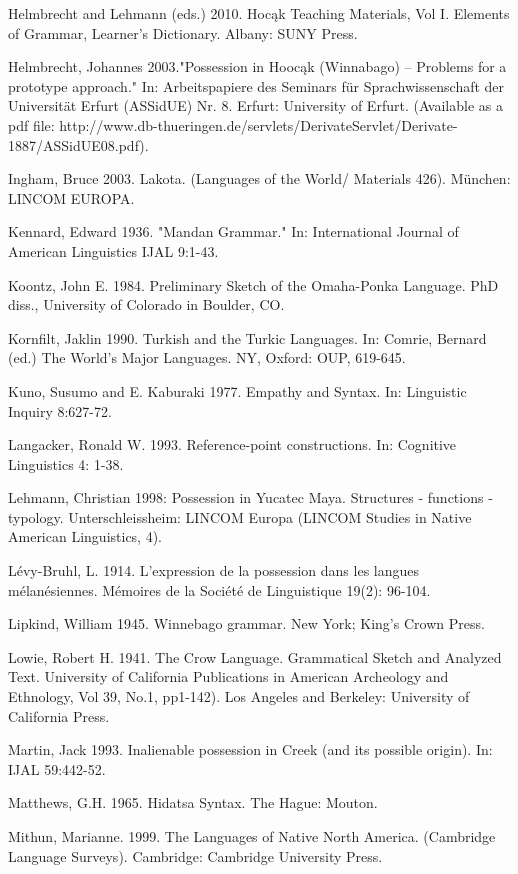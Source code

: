 \documentclass[output=paper]{LSP/langsci}
\begin{document}
\begin{reflist}
Helmbrecht and Lehmann (eds.) 2010. Hoc\k{a}k Teaching Materials, Vol I. Elements of Grammar, Learner's Dictionary. Albany: SUNY Press.

Helmbrecht, Johannes 2003."Possession in Hooc\k{a}k (Winnabago) – Problems for a prototype approach." In: Arbeitspapiere des Seminars für Sprachwissenschaft der Universität Erfurt (ASSidUE) Nr. 8. Erfurt: University of Erfurt. (Available as a pdf file: http://www.db-thueringen.de/servlets/DerivateServlet/Derivate-1887/ASSidUE08.pdf).

Ingham, Bruce 2003. Lakota. (Languages of the World/ Materials 426). München: LINCOM EUROPA.

Kennard, Edward 1936. "Mandan Grammar." In: International Journal of American Linguistics IJAL 9:1-43.

Koontz, John E. 1984. Preliminary Sketch of the Omaha-Ponka Language. PhD diss., University of Colorado in Boulder, CO.

Kornfilt, Jaklin 1990. Turkish and the Turkic Languages. In: Comrie, Bernard (ed.) The World's Major Languages. NY, Oxford: OUP, 619-645.

Kuno, Susumo and E. Kaburaki 1977. Empathy and Syntax. In: Linguistic Inquiry 8:627-72.

Langacker, Ronald W. 1993. Reference-point constructions. In: Cognitive Linguistics 4: 1-38.

Lehmann, Christian 1998: Possession in Yucatec Maya. Structures - functions - typology. Unterschleissheim: LINCOM Europa (LINCOM Studies in Native American Linguistics, 4).

Lévy-Bruhl, L. 1914. L’expression de la possession dans les langues mélanésiennes. Mémoires de la Société de Linguistique 19(2): 96-104.

Lipkind, William 1945. Winnebago grammar. New York; King’s Crown Press.

Lowie, Robert H. 1941. The Crow Language. Grammatical Sketch and Analyzed Text. University of California Publications in American Archeology and Ethnology, Vol 39, No.1, pp1-142). Los Angeles and Berkeley: University of California Press.

Martin, Jack 1993. Inalienable possession in Creek (and its possible origin). In: IJAL 59:442-52.

Matthews, G.H. 1965. Hidatsa Syntax. The Hague: Mouton.

Mithun, Marianne. 1999. The Languages of Native North America. (Cambridge Language Surveys). Cambridge: Cambridge University Press.


\end{reflist}
\end{document}
